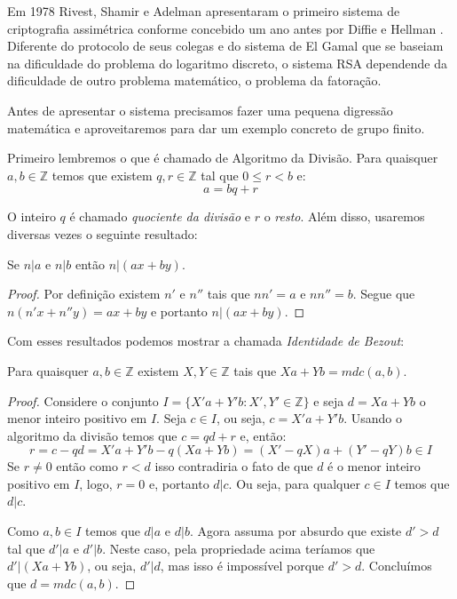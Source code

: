 
Em 1978 Rivest, Shamir e Adelman apresentaram o primeiro sistema de criptografia assimétrica conforme concebido um ano antes por Diffie e Hellman \cite{Rivest78}.
Diferente do protocolo de seus colegas e do sistema de El Gamal que se baseiam na dificuldade do problema do logaritmo discreto, o sistema RSA dependende da dificuldade de outro problema matemático, o problema da fatoração.

Antes de apresentar o sistema precisamos fazer uma pequena digressão matemática e aproveitaremos para dar um exemplo concreto de grupo finito.

Primeiro lembremos o que é chamado de Algoritmo da Divisão.
Para quaisquer $a, b \in \mathbb{Z}$ temos que existem $q, r \in \mathbb{Z}$ tal que $0 \leq r < b$ e:
\begin{displaymath}
  a = bq + r
\end{displaymath}

O inteiro $q$ é chamado {\em quociente da divisão} e $r$ o {\em resto}.
Além disso, usaremos diversas vezes o seguinte resultado:

\begin{proposition}
Se $n|a$ e $n|b$ então $n|(ax + by)$.  
\end{proposition}
\begin{proof}
Por definição existem $n'$ e $n''$ tais que $nn' = a$ e $nn'' = b$.
Segue que $n(n'x + n''y) = ax + by$ e portanto $n|(ax + by)$.
\end{proof}

Com esses resultados podemos mostrar a chamada {\em Identidade de Bezout}:

\begin{proposition}
  Para quaisquer $a,b \in \mathbb{Z}$ existem $X, Y \in \mathbb{Z}$ tais que $Xa + Yb = mdc(a,b)$.
\end{proposition}
\begin{proof}
  Considere o conjunto $I = \{X'a + Y'b: X', Y' \in \mathbb{Z}\}$ e seja $d = Xa + Yb$ o menor inteiro positivo em $I$.
  Seja $c \in I$, ou seja, $c = X'a + Y'b$.
  Usando o algoritmo da divisão temos que $c = qd + r$ e, então:
  \begin{displaymath}
    r = c - qd = X'a + Y'b - q(Xa + Yb) = (X' - qX)a + (Y' - qY)b \in I
  \end{displaymath}
  Se $r \neq 0$ então como $r < d$ isso contradiria o fato de que $d$ é o menor inteiro positivo em $I$, logo, $r = 0$ e, portanto $d|c$.
  Ou seja, para qualquer $c \in I$ temos que $d|c$.
  
  Como $a, b \in I$ temos que $d|a$ e $d|b$.
  Agora assuma por absurdo que existe $d' > d$ tal que $d'|a$ e $d'|b$.
  Neste caso, pela propriedade acima teríamos que $d'|(Xa + Yb)$, ou seja, $d'|d$, mas isso é impossível porque $d' > d$.
  Concluímos que $d = mdc(a,b)$.
\end{proof}

